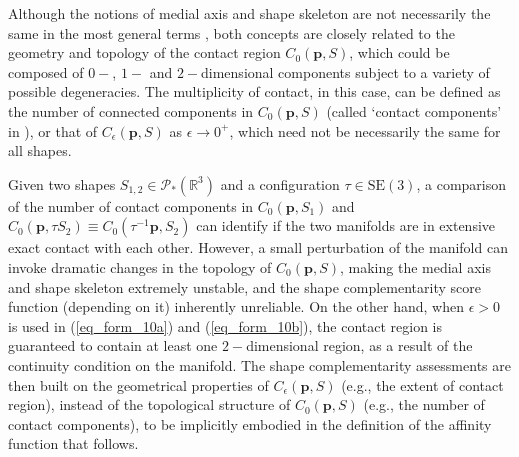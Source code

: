 \documentclass[article]{gmp2014}
\theoremstyle{definition}
\begin{document}
Although the notions of medial axis and shape skeleton are not necessarily the same in the most general terms \cite{Choi1997}, both concepts are closely related to the geometry and topology of the contact region $C_0(\mathbf{p}, S)$, which could be composed of $0-$, $1-$ and $2-$dimensional components subject to a variety of possible degeneracies. The multiplicity of contact, in this case, can be defined as the number of connected components in $C_0(\mathbf{p}, S)$ (called `contact components' in \cite{Choi1997}), or that of $C_\epsilon(\mathbf{p}, S)$ as $\epsilon \to 0^+$, which need not be necessarily the same for all shapes.

Given two shapes $S_{1,2} \in \mathcal{P}_\ast(\mathds{R}^3)$ and a configuration $\tau \in \mathrm{SE}(3)$, a comparison of the number of contact components in $C_0(\mathbf{p}, S_1)$ and $C_0(\mathbf{p}, \tau S_2) \equiv C_0(\tau^{-1}\mathbf{p}, S_2)$ can identify if the two manifolds are in extensive exact contact with each other. However, a small perturbation of the manifold can invoke dramatic changes in the topology of $C_0(\mathbf{p}, S)$, making the medial axis and shape skeleton extremely unstable, and the shape complementarity score function (depending on it) inherently unreliable. On the other hand, when $\epsilon > 0$ is used in (\ref{eq_form_10a}) and (\ref{eq_form_10b}), the contact region is guaranteed to contain at least one $2-$dimensional region, as a result of the continuity condition on the manifold. The shape complementarity assessments are then built on the geometrical properties of $C_\epsilon(\mathbf{p}, S)$ (e.g., the extent of contact region), instead of the topological structure of $C_0(\mathbf{p}, S)$ (e.g., the number of contact components), to be implicitly embodied in the definition of the affinity function that follows.
\end{document}
